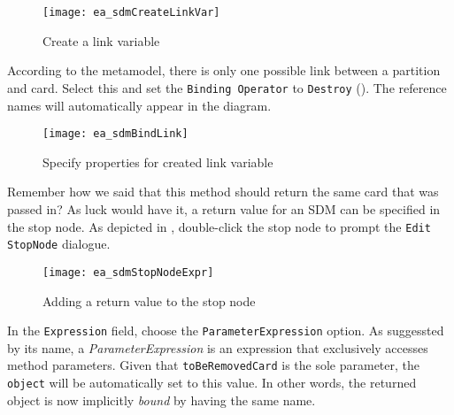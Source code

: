 \begin{stepbystep}
\begin{figure}[htpb]
\begin{center}
  \texttt{[image: ea\_sdmCreateLinkVar]}
  \caption{Create a link variable}   
  \label{ea:link_variable}
\end{center}
\end{figure}

\item According to the metamodel, there is only one possible link between a partition and card. Select this and set the
\texttt{Binding Operator} to \texttt{Destroy} (). The reference names will automatically appear in the diagram.

\vspace{0.5cm}

\begin{figure}[h!]
\begin{center} 
 \texttt{[image: ea\_sdmBindLink]}
  \caption{Specify properties for created link variable}  
  \label{ea:link_variable_properties}
\end{center}
\end{figure}

\vspace{0.5cm}

\item Remember how we said that this method should return the same card that was passed in? As luck would have it, a return value for an
SDM can be specified in the stop node. As depicted in , double-click the stop node to prompt the \texttt{Edit StopNode}
dialogue.

\newpage

\begin{figure}[htbp]
\begin{center}
  \texttt{[image: ea\_sdmStopNodeExpr]}
  \caption{Adding a return value to the stop node}  
  \label{ea:stop_node_return_value}
\end{center}
\end{figure}

\item In the \texttt{Expression} field, choose the \texttt{ParameterExpression} option.
As suggessted by its name, a \emph{ParameterExpression} is an expression that exclusively accesses method parameters. Given that \texttt{toBeRemovedCard} is the sole
parameter, the \texttt{object} will be automatically set to this value. In other words, the returned object is now implicitly \emph{bound} by having the same
name.


\end{stepbystep}
